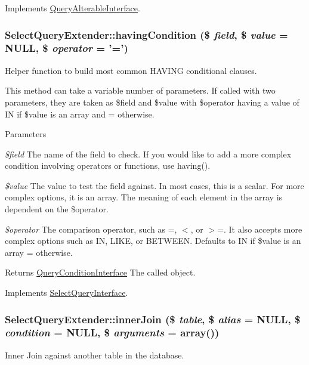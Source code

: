Implements \hyperlink{interfaceQueryAlterableInterface_a1273bb283ebfe44b6c839d97b18056a9}{QueryAlterableInterface}.\hypertarget{classSelectQueryExtender_a33ac4aade6da091ee121cd442f32c5a2}{
\subsubsection[{havingCondition}]{\setlength{\rightskip}{0pt plus 5cm}SelectQueryExtender::havingCondition (\$ {\em field}, \/  \$ {\em value} = {\ttfamily NULL}, \/  \$ {\em operator} = {\ttfamily '='})}}
\label{classSelectQueryExtender_a33ac4aade6da091ee121cd442f32c5a2}
Helper function to build most common HAVING conditional clauses.

This method can take a variable number of parameters. If called with two parameters, they are taken as \$field and \$value with \$operator having a value of IN if \$value is an array and = otherwise.


\begin{DoxyParams}{Parameters}
\item[{\em \$field}]The name of the field to check. If you would like to add a more complex condition involving operators or functions, use having(). \item[{\em \$value}]The value to test the field against. In most cases, this is a scalar. For more complex options, it is an array. The meaning of each element in the array is dependent on the \$operator. \item[{\em \$operator}]The comparison operator, such as =, $<$, or $>$=. It also accepts more complex options such as IN, LIKE, or BETWEEN. Defaults to IN if \$value is an array = otherwise. \end{DoxyParams}
\begin{DoxyReturn}{Returns}
\hyperlink{interfaceQueryConditionInterface}{QueryConditionInterface} The called object. 
\end{DoxyReturn}


Implements \hyperlink{interfaceSelectQueryInterface_a5b33d0a9d60cb31a705d590ae1cf8bef}{SelectQueryInterface}.\hypertarget{classSelectQueryExtender_a4c37ec31ec8dce6287cb5d211886b23e}{
\subsubsection[{innerJoin}]{\setlength{\rightskip}{0pt plus 5cm}SelectQueryExtender::innerJoin (\$ {\em table}, \/  \$ {\em alias} = {\ttfamily NULL}, \/  \$ {\em condition} = {\ttfamily NULL}, \/  \$ {\em arguments} = {\ttfamily array()})}}
\label{classSelectQueryExtender_a4c37ec31ec8dce6287cb5d211886b23e}
Inner Join against another table in the database.



